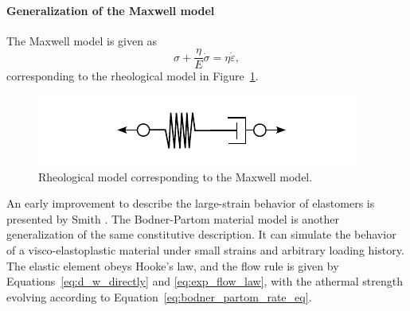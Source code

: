 \paragraph{Generalization of the Maxwell model}
The Maxwell model is given as
\begin{equation}
	\sigma + \frac{\eta}{E}\dot \sigma = \eta \dot \varepsilon,
\end{equation}
corresponding to the rheological model in Figure~\ref{fig:rheo_model_maxwell}.
\begin{figure}[hbtp]
	\centering
	\includegraphics{figures/rheo_model_maxwell}
	\caption{Rheological model corresponding to the Maxwell model.}
\label{fig:rheo_model_maxwell}
\end{figure}
An early improvement to describe the large-strain behavior of elastomers is presented by Smith \citep{smithNonlinearViscoelasticResponse1962}.
The Bodner-Partom material model \citep{bodnerConstitutiveEquationsElasticViscoplastic1975} is another generalization of the same constitutive description.
It can simulate the behavior of a visco-elastoplastic material under small strains and arbitrary loading history.
The elastic element obeys Hooke's law, and the flow rule is given by Equations~\eqref{eq:d_w_directly} and \eqref{eq:exp_flow_law}, with the athermal strength evolving according to Equation~\eqref{eq:bodner_partom_rate_eq}.
